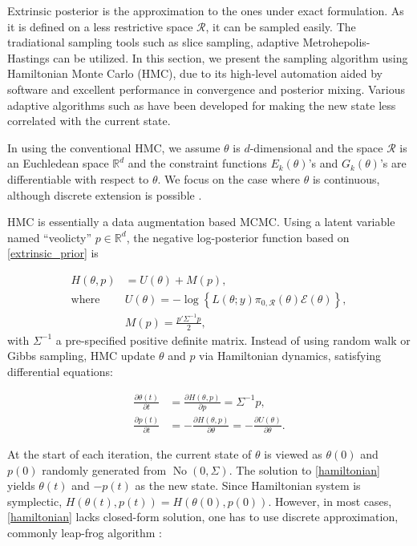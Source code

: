 \documentclass[10pt]{article}
\newcommand{\mc}[1]{\mathcal{#1}}
\DeclareMathOperator{\No}{No}
\begin{document}
Extrinsic posterior is the approximation to the ones under exact formulation. As it is defined on a less restrictive space $\mc R$, it can be sampled easily. The tradiational sampling tools such as slice sampling, adaptive Metrohepolis-Hastings can be utilized. In this section, we present the sampling algorithm using Hamiltonian Monte Carlo (HMC), due to its high-level automation aided by software and excellent performance in convergence and posterior mixing. Various adaptive algorithms such as \cite{hoffman2014no} have been developed for making the new state less correlated with the current state.

In using the conventional HMC, we assume $\theta$ is $d$-dimensional and the space $\mc R$ is an Euchledean space $\mathbb R^d$ and the constraint functions $E_k(\theta)$'s and $G_k(\theta)$'s  are differentiable with respect to $\theta$. We focus on the case where $\theta$ is continuous, although discrete extension is possible \citep{zhang2012continuous}.

HMC is essentially a data augmentation based MCMC. Using a latent variable named ``veolicty'' $p\in \mathbb R^d$, the negative log-posterior function based on \eqref{extrinsic_prior} is

\begin{equation}
\begin{aligned}
H(\theta, p)& = U(\theta)+M(p),\\
\text{where } & U(\theta) = -\log\left\{ L(\theta;y)\pi_{0,\mc R}(\theta) \mc{E}(\theta) \right\},\\
& M(p) = \frac{p'\Sigma^{-1} p}{2},\end{aligned}
\end{equation}
with $\Sigma^{-1}$ a pre-specified positive definite matrix. Instead of using random walk or Gibbs sampling, HMC update $\theta$ and $p$ via Hamiltonian dynamics, satisfying differential equations:

\begin{equation}
\begin{aligned}
\label{hamiltonian}
\frac{\partial \theta (t)}{\partial t} & =\frac{\partial H(\theta, p)}{\partial p} = \Sigma^{-1}p,\\
\frac{\partial p(t)}{\partial t}& =-\frac{\partial H(\theta, p)}{\partial \theta} = -\frac{\partial U(\theta)}{\partial \theta}.
\end{aligned}
\end{equation}

At the start of each iteration, the current state of $\theta$ is viewed as $\theta(0)$ and $p(0)$ randomly generated from $\No(0, \Sigma)$. The solution to \eqref{hamiltonian} yields $\theta(t)$ and $-p(t)$ as the new state. Since Hamiltonian system is symplectic, $H(\theta(t),p(t))=H(\theta(0),p(0))$. However, in most cases, \eqref{hamiltonian} lacks closed-form solution, one has to use discrete approximation, commonly leap-frog algorithm \citep{neal2011mcmc}:
\end{document}
